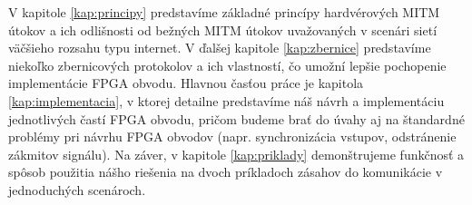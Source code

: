 V kapitole \ref{kap:principy} predstavíme základné princípy hardvérových MITM útokov a ich odlišnosti od bežných MITM útokov uvažovaných v scenári sietí väčšieho rozsahu typu internet. V ďalšej kapitole \ref{kap:zbernice} predstavíme niekoľko zbernicových protokolov a ich vlastností, čo umožní lepšie pochopenie implementácie FPGA obvodu. Hlavnou časťou práce je kapitola \ref{kap:implementacia}, v ktorej detailne predstavíme náš návrh a implementáciu jednotlivých častí FPGA obvodu, pričom budeme brať do úvahy aj na štandardné problémy pri návrhu FPGA obvodov (napr. synchronizácia vstupov, odstránenie zákmitov signálu). Na záver, v kapitole \ref{kap:priklady} demonštrujeme funkčnosť a spôsob použitia nášho riešenia na dvoch príkladoch zásahov do komunikácie v jednoduchých scenároch.